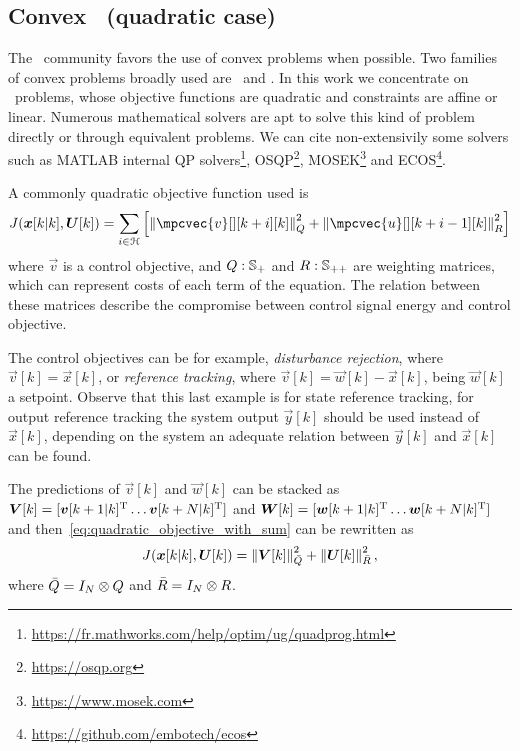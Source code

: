 \documentclass[../main.tex]{subfiles}
\begin{document}
\subsection{Convex \mpc\ (quadratic case) }
The \mpc\ community favors the use of convex problems when possible. Two families of convex problems broadly used are \qp\ and \lp.
In this work we concentrate on \qp\ problems, whose objective functions are quadratic and constraints are affine or linear. Numerous mathematical solvers are apt to solve this kind of problem directly or through equivalent problems. We can cite non-extensivily some solvers such as MATLAB internal QP solvers\footnote{\url{https://fr.mathworks.com/help/optim/ug/quadprog.html}}, OSQP\footnote{\url{https://osqp.org}}, MOSEK\footnote{\url{https://www.mosek.com}} and ECOS\footnote{\url{https://github.com/embotech/ecos}}.

A commonly quadratic objective function used is
\begin{equation}
  \label{eq:quadratic_objective_with_sum}
  J(\vec{x}[k|k],\vec{U}[k])=\sum_{i\in\set{H}}\left[\norm{\mpcvec{v}[ ][k+i][k]}^{2}_{Q} +\norm{\mpcvec{u}[ ][k+i-1][k]}^{2}_{R}\right]
\end{equation}
where $\vec{v}$ is a control objective, and ${ Q:\mathbb{S}_{+} }$ and ${ R:\mathbb{S}_{++} }$ are weighting matrices, which can represent costs of each term of the equation. The relation between these matrices describe the compromise between control signal energy and control objective.

The control objectives can be for example, \emph{disturbance rejection}, where ${ \vec{v}[k]=\vec{x}[k] }$, or \emph{reference tracking}, where ${ \vec{v}[k]=\vec{w}[k]-\vec{x}[k] }$, being $\vec{w}[k]$ a setpoint.
Observe that this last example is for state reference tracking, for output reference tracking the system output $\vec{y}[k]$ should be used instead of $\vec{x}[k]$, depending on the system an adequate relation between $\vec{y}[k]$ and $\vec{x}[k]$ can be found.

The predictions of $\vec{v}[k]$ and $\vec{w}[k]$ can be stacked as ${ \boldsymbol{V}[k]=[\boldsymbol{v}[k+1|k]^{\mathrm{T}} \dots \boldsymbol{v}[k+N|k]^{\mathrm{T}}] }$ and
${ \boldsymbol{W}[k]=[\boldsymbol{w}[k+1|k]^{\mathrm{T}} \dots \boldsymbol{w}[k+N|k]^{\mathrm{T}}] }$ and then~\eqref{eq:quadratic_objective_with_sum} can be rewritten as
\begin{equation}
  \label{eq:quadratic_objective_compact}
  J(\boldsymbol{x}[k|k],\boldsymbol{U}[k])=\left\lVert\boldsymbol{V}[k]\right\rVert^{2}_{\bar{Q}} + \left\lVert\boldsymbol{U}[k] \right\rVert^{2}_{\bar{R}},
\end{equation}
where $\bar{Q}=I_{N}\otimes Q$ and
$\bar{R}=I_{N}\otimes R$.
\end{document}
